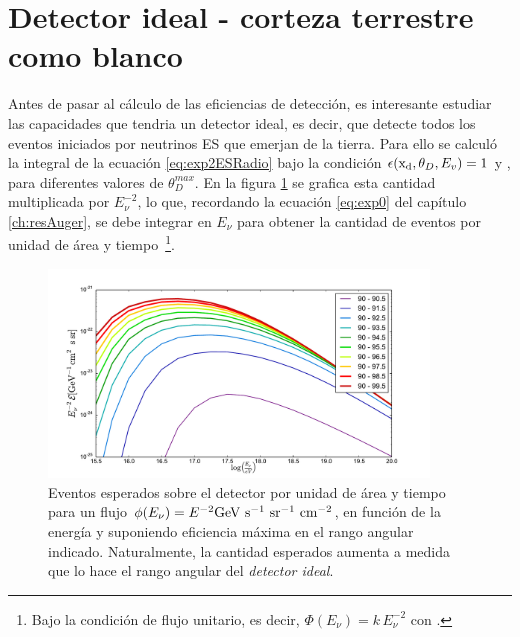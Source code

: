 \section{Detector ideal - corteza terrestre como blanco}
	Antes de pasar al c\'alculo de las eficiencias de detecci\'on, es interesante estudiar las capacidades que tendria un detector ideal, es decir, que detecte todos los eventos iniciados por neutrinos ES que emerjan de la tierra.
	Para ello se calcul\'o la integral de la ecuaci\'on \ref{eq:exp2ESRadio} bajo la condici\'on $\epsilon ({\rm x_d},\theta_D,E_v) = 1$ y , para diferentes valores de $\theta_D^{max}$.
	En la figura \ref{fig:exposuresFluxThetas} se grafica esta cantidad multiplicada por $E_\nu^{-2}$, lo que, recordando la ecuaci\'on \ref{eq:exp0} del cap\'itulo \ref{ch:resAuger}, se debe integrar en $E_\nu$ para obtener la cantidad de eventos por unidad de \'area y tiempo~\footnote{Bajo la condici\'on de flujo unitario, es decir, $\Phi(E_{\nu})=k\,E_\nu^{-2}$ con .}.
%
	\begin{figure}[h!]
		\begin{center}
			\includegraphics[width=0.9\textwidth]{fig/resultadosRadio/exposureFullEff_thetas}
			\caption{\label{fig:exposuresFluxThetas} Eventos esperados sobre el detector por unidad de \'area y tiempo para un flujo $\phi(E_\nu)= E^{-2}{\rm GeV\ s^{-1}\ sr^{-1}\ cm^{-2}}$, en funci\'on de la energ\'ia y suponiendo eficiencia m\'axima en el rango angular indicado.
			Naturalmente, la cantidad esperados aumenta a medida que lo hace el rango angular del \emph{detector ideal}.
			}
		\end{center}
	\end{figure}
	
